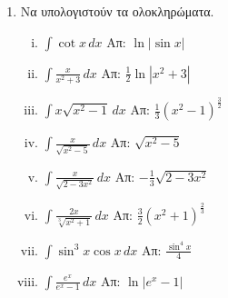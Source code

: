 \begin{enumerate}
  \item Να υπολογιστούν τα ολοκληρώματα.
    \begin{enumerate}[i)]
      \item $\int \cot x \, dx$ \hfill Απ: $\ln|\sin x|$ 
      \item $\int\frac{x}{x^2+3} \, dx$ \hfill Απ: $\frac{1}{2}\ln|x^2+3|$
      \item $ \int x \sqrt{x^{2}-1} \,{dx} $ 
        \hfill Απ: $ \frac{1}{3} (x^{2}-1)^{\frac{3}{2}} $  
      \item $\int\frac{x}{\sqrt{x^{2}-5}} \, dx$ \hfill Απ: $ \sqrt{x^{2}-5} $
      \item $\int\frac{x}{\sqrt{2-3x^{2}}} \, dx$ \hfill Απ: $ - \frac{1}{3}
      \sqrt{2-3x^{2}} $
      \item $ \int \frac{2x}{\sqrt[3]{x^{2}+1}} \,{dx} $ 
        \hfill Απ: $ \frac{3}{2} (x^{2}+1)^{\frac{2}{3}} $ 
      \item $\int \sin^3x\cos x \, dx$ \hfill Απ: $\frac{\sin^{4}x}{4}$
      \item $\int \frac{e^x}{e^x-1} \, dx$ \hfill Απ: $\ln|e^x-1|$
    \end{enumerate}
\end{enumerate}




